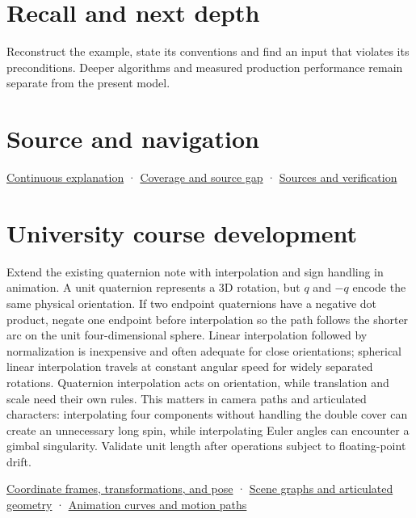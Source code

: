\section{Recall and next depth}\label{appendix-8e61ab68f6b2-recall-and-next-depth}

Reconstruct the example, state its conventions and find an input that violates its preconditions. Deeper algorithms and measured production performance remain separate from the present model.

\section{Source and navigation}\label{appendix-8e61ab68f6b2-source-and-navigation}

\href{Continuous\%20Notes/Computing\%20Foundations\%20-\%20From\%20Bits\%20to\%20C++\%20and\%20Systems\%20APIs\#Keep\%20the\%20promises\%20visible\%20while\%20moving\%20between\%20representations}{Continuous explanation} · \hyperref[appendix-fd090d982a15-phase-7---parts-601-700]{Coverage and source gap} · \hyperref[appendix-a103e7846d21-phase-7---source-analysis-and-verification]{Sources and verification}

\section{University course development}\label{appendix-8e61ab68f6b2-university-course-development}

Extend the existing quaternion note with interpolation and sign handling in animation. A unit quaternion represents a 3D rotation, but \(q\) and \(-q\) encode the same physical orientation. If two endpoint quaternions have a negative dot product, negate one endpoint before interpolation so the path follows the shorter arc on the unit four-dimensional sphere. Linear interpolation followed by normalization is inexpensive and often adequate for close orientations; spherical linear interpolation travels at constant angular speed for widely separated rotations. Quaternion interpolation acts on orientation, while translation and scale need their own rules. This matters in camera paths and articulated characters: interpolating four components without handling the double cover can create an unnecessary long spin, while interpolating Euler angles can encounter a gimbal singularity. Validate unit length after operations subject to floating-point drift.

\href{Continuous\%20Notes/University\%20-\%20Worlds,\%20Images\%20and\%20Inference\%20-\%20Graphics,\%20Vision\%20and\%20Photography\#Coordinate\%20frames,\%20transformations,\%20and\%20pose}{Coordinate frames, transformations, and pose} · \href{Continuous\%20Notes/University\%20-\%20Worlds,\%20Images\%20and\%20Inference\%20-\%20Graphics,\%20Vision\%20and\%20Photography\#Scene\%20graphs\%20and\%20articulated\%20geometry}{Scene graphs and articulated geometry} · \href{Continuous\%20Notes/University\%20-\%20Worlds,\%20Images\%20and\%20Inference\%20-\%20Graphics,\%20Vision\%20and\%20Photography\#Animation\%20curves\%20and\%20motion\%20paths}{Animation curves and motion paths}
